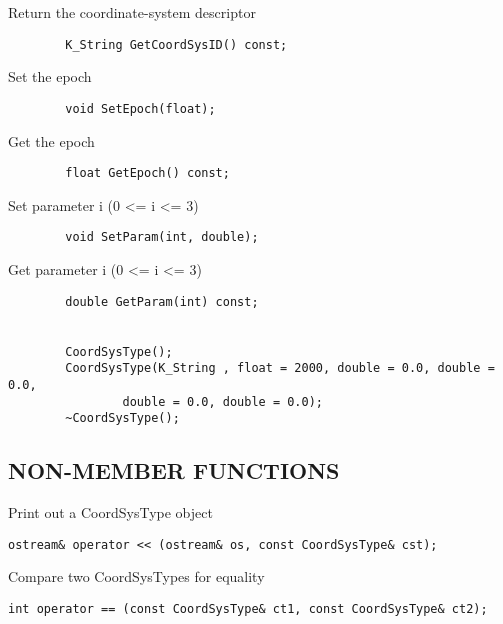            Return the coordinate-system descriptor
\begin{verbatim}
        K_String GetCoordSysID() const;
\end{verbatim}

           Set the epoch
\begin{verbatim}
        void SetEpoch(float);
\end{verbatim}

           Get the epoch
\begin{verbatim}
        float GetEpoch() const;
\end{verbatim}

           Set parameter i (0 <= i <= 3)
\begin{verbatim}
        void SetParam(int, double);
\end{verbatim}

           Get parameter i (0 <= i <= 3)
\begin{verbatim}
        double GetParam(int) const;


        CoordSysType();
        CoordSysType(K_String , float = 2000, double = 0.0, double = 0.0,
                double = 0.0, double = 0.0);
        ~CoordSysType();
\end{verbatim}

\subsection*{NON-MEMBER FUNCTIONS}

        Print out a CoordSysType object
\begin{verbatim}
ostream& operator << (ostream& os, const CoordSysType& cst);
\end{verbatim}

        Compare two CoordSysTypes for equality
\begin{verbatim}
int operator == (const CoordSysType& ct1, const CoordSysType& ct2);
\end{verbatim}
